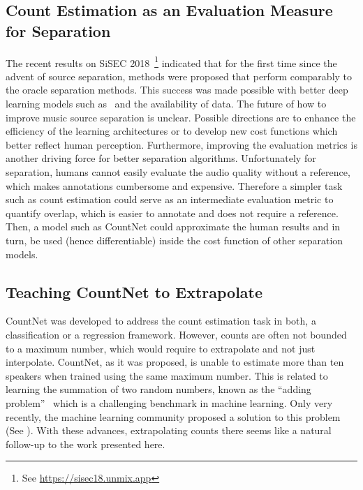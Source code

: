 \subsection*{Count Estimation as an Evaluation Measure for Separation}

The recent results on SiSEC 2018~\cite{stoeter18sisec}\footnote{See \url{https://sisec18.unmix.app}} indicated that for the first time since the advent of source separation, methods were proposed that perform comparably to the oracle separation methods.
This success was made possible with better deep learning models such as~\cite{takahashi17} and the availability of data.
The future of how to improve music source separation is unclear. Possible directions are to enhance the efficiency of the learning architectures or to develop new cost functions which better reflect human perception.
Furthermore, improving the evaluation metrics is another driving force for better separation algorithms. Unfortunately for separation, humans cannot easily evaluate the audio quality without a reference, which makes annotations cumbersome and expensive.
Therefore a simpler task such as count estimation could serve as an intermediate evaluation metric to quantify overlap, which is easier to annotate and does not require a reference. Then, a model such as CountNet could approximate the human results and in turn, be used (hence differentiable) inside the cost function of other separation models.

\subsection*{Teaching CountNet to Extrapolate}

CountNet was developed to address the count estimation task in both, a classification or a regression framework.
However, counts are often not bounded to a maximum number, which would require to extrapolate and not just interpolate.
CountNet, as it was proposed, is unable to estimate more than ten speakers when trained using the same maximum number.
This is related to learning the summation of two random numbers, known as the ``adding problem''~\cite{Hochreiter97} which is a challenging benchmark in machine learning.
Only very recently, the machine learning community proposed a solution to this problem (See \cite{trask18}).
With these advances, extrapolating counts there seems like a natural follow-up to the work presented here.
